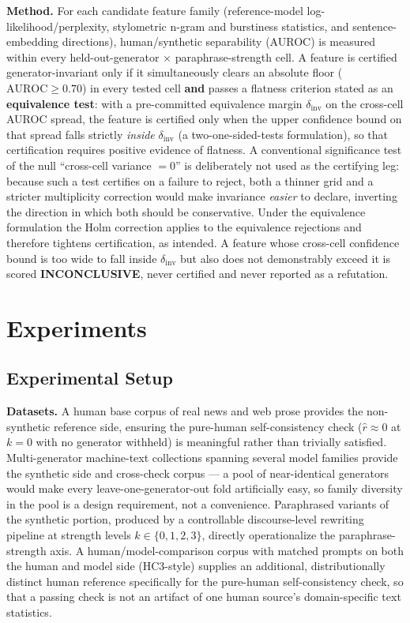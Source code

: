\documentclass[11pt]{article}
\begin{document}
\textbf{Method.} For each candidate feature family (reference-model log-likelihood/perplexity, stylometric n-gram and burstiness statistics, and sentence-embedding directions), human/synthetic separability (AUROC) is measured within every held-out-generator $\times$ paraphrase-strength cell. A feature is certified generator-invariant only if it simultaneously clears an absolute floor ($\mathrm{AUROC} \geq 0.70$) in every tested cell \textbf{and} passes a flatness criterion stated as an \textbf{equivalence test}: with a pre-committed equivalence margin $\delta_{\text{inv}}$ on the cross-cell AUROC spread, the feature is certified only when the upper confidence bound on that spread falls strictly \emph{inside} $\delta_{\text{inv}}$ (a two-one-sided-tests formulation), so that certification requires positive evidence of flatness. A conventional significance test of the null ``cross-cell variance $=0$'' is deliberately not used as the certifying leg: because such a test certifies on a failure to reject, both a thinner grid and a stricter multiplicity correction would make invariance \emph{easier} to declare, inverting the direction in which both should be conservative. Under the equivalence formulation the Holm correction applies to the equivalence rejections and therefore tightens certification, as intended. A feature whose cross-cell confidence bound is too wide to fall inside $\delta_{\text{inv}}$ but also does not demonstrably exceed it is scored \textbf{INCONCLUSIVE}, never certified and never reported as a refutation.

\section{Experiments}

\subsection{Experimental Setup}

\textbf{Datasets.} A human base corpus of real news and web prose provides the non-synthetic reference side, ensuring the pure-human self-consistency check ($\hat{r} \approx 0$ at $k=0$ with no generator withheld) is meaningful rather than trivially satisfied. Multi-generator machine-text collections spanning several model families \citep{RAID2024Benchmark,MAGE2024InTheWild} provide the synthetic side and cross-check corpus --- a pool of near-identical generators would make every leave-one-generator-out fold artificially easy, so family diversity in the pool is a design requirement, not a convenience. Paraphrased variants of the synthetic portion, produced by a controllable discourse-level rewriting pipeline \citep{DipperParaphrase2023} at strength levels $k \in \{0,1,2,3\}$, directly operationalize the paraphrase-strength axis. A human/model-comparison corpus with matched prompts on both the human and model side (HC3-style) supplies an additional, distributionally distinct human reference specifically for the pure-human self-consistency check, so that a passing check is not an artifact of one human source's domain-specific text statistics.
\end{document}
